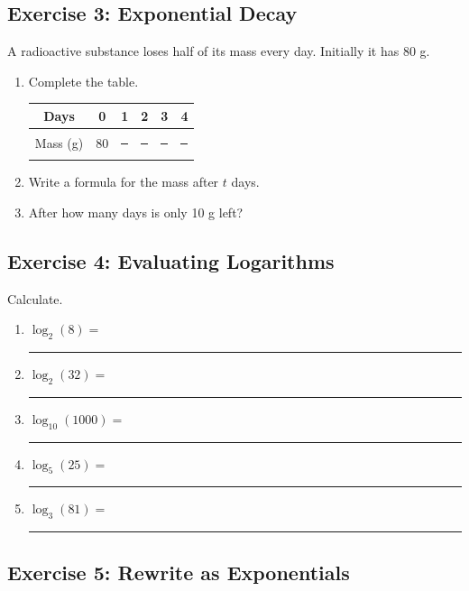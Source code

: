 \documentclass[a4paper, 11pt]{article}
\begin{document}
\subsection*{Exercise 3: Exponential Decay}

A radioactive substance loses half of its mass every day. Initially it has 80 g.

\begin{enumerate}
    \item Complete the table.

    \begin{center}
    \begin{tabular}{c|ccccc}
        Days & 0 & 1 & 2 & 3 & 4\\
        \hline
        Mass (g) & 80 &
        \rule{1cm}{0.4pt} &
        \rule{1cm}{0.4pt} &
        \rule{1cm}{0.4pt} &
        \rule{1cm}{0.4pt}
    \end{tabular}
    \end{center}

    \item Write a formula for the mass after $t$ days.

    \vspace{1cm}

    \item After how many days is only 10 g left?

    \vspace{1cm}
\end{enumerate}

\subsection*{Exercise 4: Evaluating Logarithms}

Calculate.

\begin{enumerate}
    \item $\log_2(8)=$ \rule{2cm}{0.4pt}
    \item $\log_2(32)=$ \rule{2cm}{0.4pt}
    \item $\log_{10}(1000)=$ \rule{2cm}{0.4pt}
    \item $\log_5(25)=$ \rule{2cm}{0.4pt}
    \item $\log_3(81)=$ \rule{2cm}{0.4pt}
\end{enumerate}

\subsection*{Exercise 5: Rewrite as Exponentials}
\end{document}
